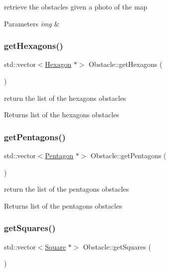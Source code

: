 retrieve the obstacles given a photo of the map 
\begin{DoxyParams}{Parameters}
{\em img} & \\
\hline
\end{DoxyParams}
\mbox{\label{class_obstacle_a26db0857f78a85a975957720eeb0464d}} 
\subsubsection{\texorpdfstring{get\+Hexagons()}{getHexagons()}}
{\footnotesize\ttfamily std\+::vector$<$\mbox{\hyperlink{class_geometry2_d_1_1_hexagon}{Hexagon}} $\ast$$>$ Obstacle\+::get\+Hexagons (\begin{DoxyParamCaption}{ }\end{DoxyParamCaption})}

return the list of the hexagons obstacles \begin{DoxyReturn}{Returns}
list of the hexagons obstacles 
\end{DoxyReturn}
\mbox{\label{class_obstacle_a7cbf1671e8fef324fe113517094f8428}} 
\subsubsection{\texorpdfstring{get\+Pentagons()}{getPentagons()}}
{\footnotesize\ttfamily std\+::vector$<$\mbox{\hyperlink{class_geometry2_d_1_1_pentagon}{Pentagon}} $\ast$$>$ Obstacle\+::get\+Pentagons (\begin{DoxyParamCaption}{ }\end{DoxyParamCaption})}

return the list of the pentagons obstacles \begin{DoxyReturn}{Returns}
list of the pentagons obstacles 
\end{DoxyReturn}
\mbox{\label{class_obstacle_aa7d4a88d87f53bc8ba1e2b9123354f3c}} 
\subsubsection{\texorpdfstring{get\+Squares()}{getSquares()}}
{\footnotesize\ttfamily std\+::vector$<$\mbox{\hyperlink{class_geometry2_d_1_1_square}{Square}} $\ast$$>$ Obstacle\+::get\+Squares (\begin{DoxyParamCaption}{ }\end{DoxyParamCaption})}

